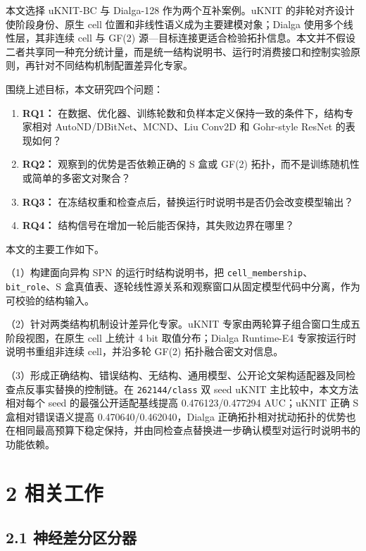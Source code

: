 \documentclass[
  a4paper,
  UTF8]{ctexart}
\providecommand{\tightlist}{%
  \setlength{\itemsep}{0pt}\setlength{\parskip}{0pt}}
\begin{document}
本文选择 uKNIT-BC 与 Dialga-128 作为两个互补案例。uKNIT
的非轮对齐设计使阶段身份、原生 cell
位置和非线性语义成为主要建模对象；Dialga 使用多个线性层，其非连续 cell
与 GF(2)
源---目标连接更适合检验拓扑信息。本文并不假设二者共享同一种充分统计量，而是统一结构说明书、运行时消费接口和控制实验原则，再针对不同结构机制配置差异化专家。

围绕上述目标，本文研究四个问题：

\begin{enumerate}
\def\labelenumi{\arabic{enumi}.}
\tightlist
\item
  \textbf{RQ1：}
  在数据、优化器、训练轮数和负样本定义保持一致的条件下，结构专家相对
  AutoND/DBitNet、MCND、Liu Conv2D 和 Gohr-style ResNet 的表现如何？
\item
  \textbf{RQ2：} 观察到的优势是否依赖正确的 S 盒或 GF(2)
  拓扑，而不是训练随机性或简单的多密文对聚合？
\item
  \textbf{RQ3：}
  在冻结权重和检查点后，替换运行时说明书是否仍会改变模型输出？
\item
  \textbf{RQ4：} 结构信号在增加一轮后能否保持，其失败边界在哪里？
\end{enumerate}

本文的主要工作如下。

（1）构建面向异构 SPN 的运行时结构说明书，把
\texttt{cell\_membership}、\texttt{bit\_role}、S
盒真值表、逐轮线性源关系和观察窗口从固定模型代码中分离，作为可校验的结构输入。

（2）针对两类结构机制设计差异化专家。uKNIT
专家由两轮算子组合窗口生成五阶段视图，在原生 cell 上统计 4 bit
取值分布；Dialga Runtime-E4 专家按运行时说明书重组非连续 cell，并沿多轮
GF(2) 拓扑融合密文对信息。

（3）形成正确结构、错误结构、无结构、通用模型、公开论文架构适配器及同检查点反事实替换的控制链。在
\texttt{262144/class} 双 seed uKNIT 主比较中，本文方法相对每个 seed
的最强公开适配基线提高 0.476123/0.477294 AUC；uKNIT 正确 S
盒相对错误语义提高 0.470640/0.462040，Dialga
正确拓扑相对扰动拓扑的优势也在相同最高预算下稳定保持，并由同检查点替换进一步确认模型对运行时说明书的功能依赖。

\hypertarget{ux76f8ux5173ux5de5ux4f5c}{%
\section{2 相关工作}\label{ux76f8ux5173ux5de5ux4f5c}}

\hypertarget{ux795eux7ecfux5deeux5206ux533aux5206ux5668}{%
\subsection{2.1
神经差分区分器}\label{ux795eux7ecfux5deeux5206ux533aux5206ux5668}}
\end{document}
